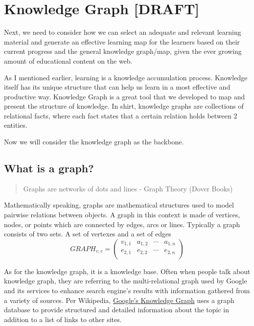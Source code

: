 \documentclass[]{book}
\theoremstyle{definition}
\theoremstyle{definition}
\theoremstyle{definition}
\theoremstyle{remark}
\begin{document}
\section{Knowledge Graph {[}DRAFT{]}}\label{knowledge-graph-draft}

Next, we need to consider how we can select an adequate and relevant
learning material and generate an effective learning map for the
learners based on their current progress and the general knowledge
graph/map, given the ever growing amount of educational content on the
web.

As I mentioned earlier, learning is a knowledge accumulation process.
Knowledge itself has its unique structure that can help us learn in a
most effective and productive way. Knowledge Graph is a great tool that
we developed to map and present the structure of knowledge. In shirt,
knowledge graphs are collections of relational facts, where each fact
states that a certain relation holds between 2 entities.

Now we will consider the knowledge graph as the backbone.

\subsection{What is a graph?}\label{what-is-a-graph}

\begin{quote}
Graphs are networks of dots and lines - Graph Theory (Dover Books)
\end{quote}

Mathematically speaking, graphs are mathematical structures used to
model pairwise relations between objects. A graph in this context is
made of vertices, nodes, or points which are connected by edges, arcs or
lines. Typically a graph consists of two sets. A set of vertexes and a
set of edges \[GRAPH_{v,e} =
 \begin{pmatrix}
  v_{1,1} & a_{1,2} & \cdots & a_{1,n} \\
  e_{2,1} & e_{2,2} & \cdots & e_{2,n} \\
 \end{pmatrix}\]

As for the knowledge graph, it is a knowledge base. Often when people
talk about knowledge graph, they are referring to the multi-relational
graph used by Google and its services to enhance search engine's results
with information gathered from a variety of sources. Per Wikipedia,
\href{https://developers.google.com/knowledge-graph/\#knowledge_graph_entities}{Google's
Knowledge Graph} uses a graph database to provide structured and
detailed information about the topic in addition to a list of links to
other sites.
\end{document}
